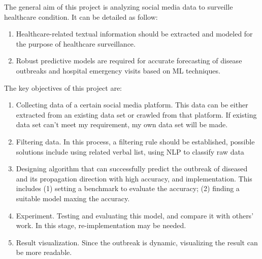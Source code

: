 The general aim of this project is analyzing social media data to surveille healthcare condition. It can be detailed as follow:
\begin{enumerate}
    \item Healthcare-related textual information should be extracted and modeled for the purpose of healthcare surveillance.
    \item Robust predictive models are required for accurate forecasting of disease outbreaks and hospital emergency visits based on ML techniques.
\end{enumerate}

The key objectives of this project are:

\begin{enumerate}
    \item Collecting data of a certain social media platform. This data can be either extracted from an existing data set or crawled from that platform. If existing data set can’t meet my requirement, my own data set will be made.
    \item Filtering data. In this process, a filtering rule should be established, possible solutions include using related verbal list, using NLP to classify raw data
    \item Designing algorithm that can successfully predict the outbreak of diseased and its propagation direction with high accuracy, and implementation. This includes (1) setting a benchmark to evaluate the accuracy; (2) finding a suitable model maxing the accuracy.
    \item Experiment. Testing and evaluating this model, and compare it with others’ work. In this stage, re-implementation may be needed.
    \item Result visualization. Since the outbreak is dynamic, visualizing the result can be more readable.
\end{enumerate}